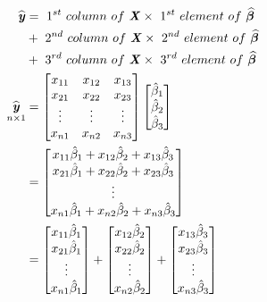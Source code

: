\documentclass[12pt]{report}
\begin{document}
\begin{align*}
\widehat{\textbf{\textit{y}}} &=\ 1^{st}\ column\ of\ \textbf{\textit{X}} \times\ 1^{st}\ element\ of\ \widehat{\boldsymbol{\beta}} \\
&+\ 2^{nd}\ column\ of\ \textbf{\textit{X}} \times\ 2^{nd}\ element\ of\ \widehat{\boldsymbol{\beta}}\\
&+\ 3^{rd}\ column\ of\ \textbf{\textit{X}} \times\ 3^{rd}\ element\ of\ \widehat{\boldsymbol{\beta}} \\
\underset{n\times1}{\widehat{\textbf{\textit{y}}}}
	&=
	\begin{bmatrix}
	x_{11} & x_{12} & x_{13} \\
	x_{21} & x_{22} & x_{23} \\
	\vdots & \vdots & \vdots \\
	x_{n1} & x_{n2} & x_{n3} 
	\end{bmatrix}
	\begin{bmatrix}
	\hat{\beta}_1 \\
	\hat{\beta}_2 \\
	\hat{\beta}_3 
	\end{bmatrix} \\
	&=
	\begin{bmatrix}
	x_{11}\hat{\beta}_1+x_{12}\hat{\beta}_2+	x_{13}\hat{\beta}_3 \\
	x_{21}\hat{\beta}_1+x_{22}\hat{\beta}_2+	x_{23}\hat{\beta}_3 \\
	\vdots \\
	x_{n1}\hat{\beta}_1+x_{n2}\hat{\beta}_2+	x_{n3}\hat{\beta}_3 
	\end{bmatrix} \\
	&=
	\begin{bmatrix}
	x_{11}\hat{\beta}_1 \\
	x_{21}\hat{\beta}_1 \\
	\vdots \\
	x_{n1}\hat{\beta}_1 
	\end{bmatrix}
	+
	\begin{bmatrix}
	x_{12}\hat{\beta}_2 \\
	x_{22}\hat{\beta}_2 \\
	\vdots \\
	x_{n2}\hat{\beta}_2 
	\end{bmatrix}
	+
	\begin{bmatrix}
	x_{13}\hat{\beta}_3 \\
	x_{23}\hat{\beta}_3 \\
	\vdots \\
	x_{n3}\hat{\beta}_3 
	\end{bmatrix} \\

\end{align*}
\end{document}

